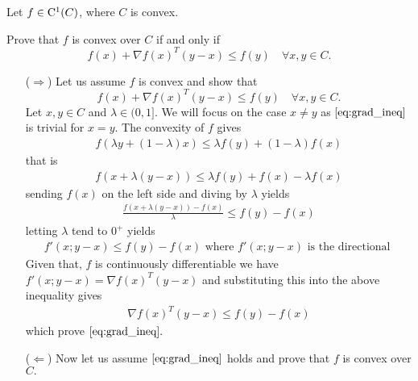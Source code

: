 \documentclass{ExerciseSheet}
\newif\ifsolutions
\begin{document}
\fi

\vskip 0.5cm

\begin{exo}\label{thm:gradient_ineq}
	Let $f\in \mathord{\mathrm{C^1}}(C)$, where $C$ is convex. 
 
 Prove that $f$ is convex over $C$ if and only if
	\begin{equation}\label{eq:grad_ineq}
		f(x) +\nabla f(x)^T(y-x)\leq f(y) \quad \forall x, y\in C.
	\end{equation}
\end{exo}

\ifsolutions
\vskip 0.3cm
\begin{solution}

\begin{itemize}
    \item [($\Rightarrow$)] Let us assume $f$ is convex and show that
    \begin{equation*}%
		f(x) +\nabla f(x)^T(y-x)\leq f(y) \quad \forall x, y\in C.
	\end{equation*}
 Let $x, y\in C$ and $\lambda \in (0, 1].$ We will focus on the case $x\neq y$ as $\eqref{eq:grad_ineq}$ is trivial for $x=y.$
 The convexity of $f$ gives
 \begin{align*}
     f\left(\lambda y + (1-\lambda)x\right) \leq \lambda f(y) + (1-\lambda)f(x)
 \end{align*}
that is 
  \begin{align*}
     f\left(x+\lambda (y-x)\right) \leq \lambda f(y) + f(x)-\lambda f(x)
 \end{align*}
sending $f(x)$ on the left side and diving by $\lambda$ yields
   \begin{align*}
     \frac{f\left(x+\lambda (y-x) \right) - f(x)}{\lambda}\leq f(y)- f(x)
 \end{align*}
letting $\lambda$ tend to $0^+$ yields
        \begin{align*}
     f'(x;y-x)\leq f(y)- f(x) \text{ where $f'(x;y-x)$ is the directional }
 \end{align*}
 Given that, $f$ is continuously differentiable we have $f'(x;y-x)=\nabla f(x)^T(y-x)$ and substituting this into the above inequality gives  
    \begin{align*}
     \nabla f(x)^T(y-x)\leq f(y)- f(x) 
 \end{align*}
which prove $\ref{eq:grad_ineq}.$
\item [($\Leftarrow$)] Now let us assume $\eqref{eq:grad_ineq}$ holds and prove that $f$ is convex over $C.$\\

\end{itemize}
\end{solution}
\end{document}
